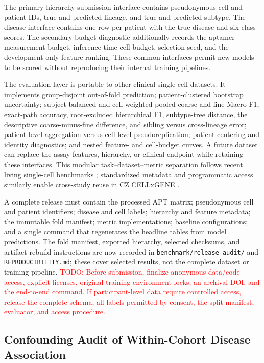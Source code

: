 \documentclass{article} %
\newcommand{\todo}[1]{\textcolor{red}{TODO: #1}}
\begin{document}
The primary hierarchy submission interface contains pseudonymous cell and patient IDs,
true and predicted lineage, and true and predicted subtype. The disease interface
contains one row per patient with the true disease and six class scores. The
secondary budget diagnostic additionally records the aptamer measurement budget, inference-time cell budget, selection
seed, and the development-only feature ranking. These common interfaces permit
new models to be scored without reproducing their internal training pipelines.

The evaluation layer is portable to other clinical single-cell datasets. It
implements group-disjoint out-of-fold prediction; patient-clustered bootstrap
uncertainty; subject-balanced and cell-weighted pooled coarse and fine Macro-F1,
exact-path accuracy, root-excluded hierarchical F1, subtype-tree distance,
the descriptive coarse-minus-fine difference, and sibling versus cross-lineage error;
patient-level aggregation versus cell-level
pseudoreplication; patient-centering and identity diagnostics; and nested feature-
and cell-budget curves. A future dataset can replace the assay features,
hierarchy, or clinical endpoint while retaining these interfaces. This modular
task--dataset--metric separation follows recent living single-cell benchmarks
\citep{luecken2025open}; standardized metadata and programmatic access similarly
enable cross-study reuse in CZ CELLxGENE \citep{czi2025cellxgene}.

A complete release must contain the processed APT matrix; pseudonymous cell and
patient identifiers; disease and cell labels; hierarchy and feature metadata;
the immutable fold manifest; metric implementations; baseline configurations;
and a single command that regenerates the headline tables from model predictions.
The fold manifest, exported hierarchy, selected checksums, and artifact-rebuild
instructions are now recorded in \texttt{benchmark/release\_audit/} and
\texttt{REPRODUCIBILITY.md}; these cover selected results, not the complete
dataset or training pipeline.
\todo{Before submission, finalize anonymous data/code access, explicit licenses,
original training environment locks, an archival DOI, and the end-to-end command.
If participant-level data require controlled access, release the complete schema,
all labels permitted by consent, the split manifest, evaluator, and access
procedure.}



\subsection{Confounding Audit of Within-Cohort Disease Association}
\label{sec:appendix:disease_patient_level}
\end{document}
